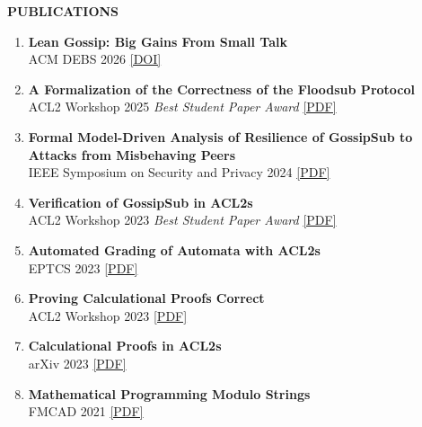 \documentclass[11pt,letterpaper]{article}
\newcommand{\cvsection}[1]{
    \vspace{0.6em} {\color{darkblue}\textbf{\Large #1}}
    \vspace{0.15em} \textcolor{lightblue}{\hrulefill}
    \vspace{0.4em} }
\begin{document}
\cvsection{PUBLICATIONS}
\begin{enumerate}
    \item \textbf{Lean Gossip: Big Gains From Small Talk} \\ ACM DEBS
      2026 \textcolor{mediumgray}{\textbullet}
      \href{https://doi.org/10.1145/3809481}{[DOI]}

    \item \textbf{A Formalization of the Correctness of the Floodsub
      Protocol} \\ ACL2 Workshop 2025
      \textcolor{mediumgray}{\textbullet} \textit{Best Student Paper
        Award} \textcolor{mediumgray}{\textbullet}
      \href{https://arxiv.org/abs/2507.19013}{[PDF]}

    \item \textbf{Formal Model-Driven Analysis of Resilience of
      GossipSub to Attacks from Misbehaving Peers} \\ IEEE Symposium
      on Security and Privacy 2024 \textcolor{mediumgray}{\textbullet}
      \href{https://arxiv.org/abs/2212.05197}{[PDF]}

    \item \textbf{Verification of GossipSub in ACL2s} \\ ACL2 Workshop
      2023 \textcolor{mediumgray}{\textbullet} \textit{Best Student
        Paper Award} \textcolor{mediumgray}{\textbullet}
      \href{https://arxiv.org/abs/2311.08859}{[PDF]}

    \item \textbf{Automated Grading of Automata with ACL2s} \\ EPTCS
      2023 \textcolor{mediumgray}{\textbullet}
      \href{https://arxiv.org/abs/2303.05867}{[PDF]}

    \item \textbf{Proving Calculational Proofs Correct} \\ ACL2
      Workshop 2023 \textcolor{mediumgray}{\textbullet}
      \href{https://arxiv.org/abs/2311.08860}{[PDF]}

    \item \textbf{Calculational Proofs in ACL2s} \\ arXiv 2023
      \textcolor{mediumgray}{\textbullet}
      \href{https://arxiv.org/abs/2307.12224}{[PDF]}

    \item \textbf{Mathematical Programming Modulo Strings} \\ FMCAD
      2021 \textcolor{mediumgray}{\textbullet}
      \href{https://ieeexplore.ieee.org/document/9617664}{[PDF]}
\end{enumerate}
\end{document}
